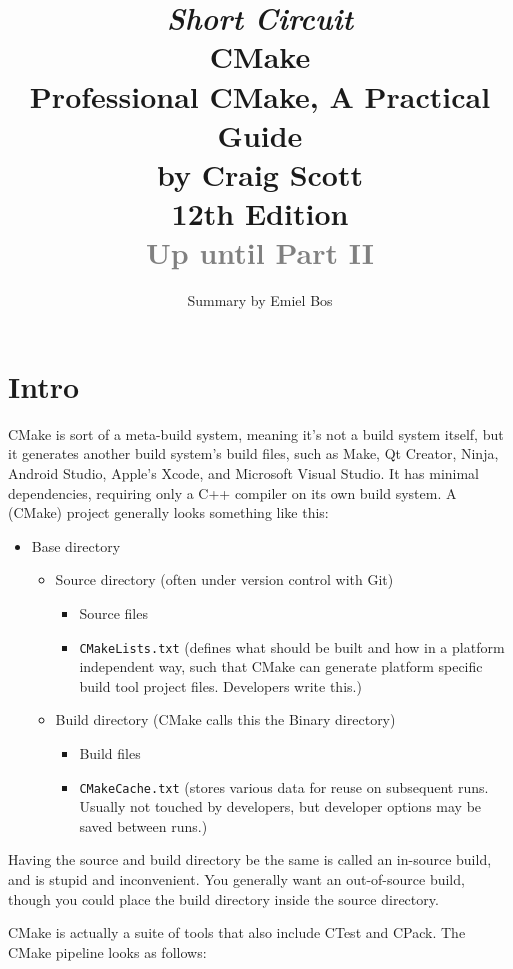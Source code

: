 \documentclass[8pt, table, xcdraw]{article}%
\title{
\textit{Short Circuit}\\
\vspace{15px}
\huge
CMake\\
\vspace{20px}
\large
Professional CMake, A Practical Guide\\
by Craig Scott\\
12th Edition\\
\textcolor{gray}{Up until Part II}
}
\author{Summary by Emiel Bos}
\date{}
\begin{document}
\maketitle

\section{Intro}

CMake is sort of a meta-build system, meaning it's not a build system itself, but it generates another build system's build files, such as Make, Qt Creator, Ninja, Android Studio, Apple's Xcode, and Microsoft Visual Studio. It has minimal dependencies, requiring only a C++ compiler on its own build system. A (CMake) project generally looks something like this:

\begin{itemize}
    \item Base directory
    \begin{itemize}
        \item Source directory (often under version control with Git)
        \begin{itemize}
            \item Source files
            \item \lstinline{CMakeLists.txt} (defines what should be built and how in a platform independent way, such that CMake can generate platform specific build tool project files. Developers write this.)
        \end{itemize}
        \item Build directory (CMake calls this the Binary directory)
        \begin{itemize}
            \item Build files
            \item \lstinline{CMakeCache.txt} (stores various data for reuse on subsequent runs. Usually not touched by developers, but developer options may be saved between runs.)
        \end{itemize}
    \end{itemize}
\end{itemize}

Having the source and build directory be the same is called an in-source build, and is stupid and inconvenient. You generally want an out-of-source build, though you could place the build directory inside the source directory.

CMake is actually a suite of tools that also include CTest and CPack. The CMake pipeline looks as follows:
\end{document}
